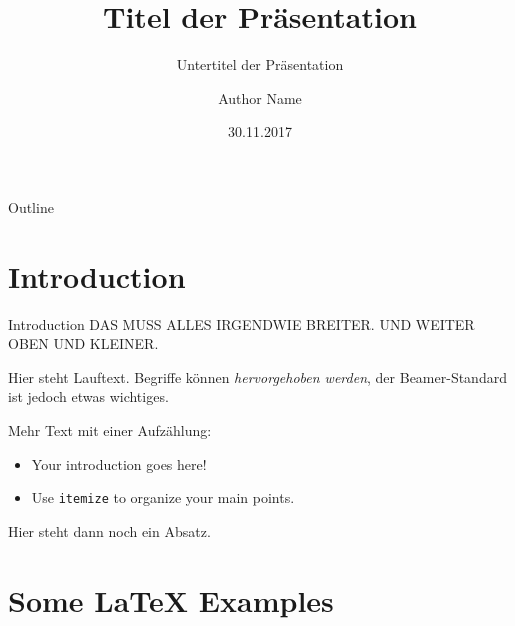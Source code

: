 \documentclass[10pt]{beamer}
\begin{document}

\title[HAW Hamburg Beamer]{Titel der Präsentation}
\subtitle{Untertitel der Präsentation}
\author{Author Name}
\date{30.11.2017}

\begin{frame}
  \titlepage
\end{frame}

\begin{frame}{Outline}
  \tableofcontents
\end{frame}

\section{Introduction}
\begin{frame}{Introduction}
  DAS MUSS ALLES IRGENDWIE BREITER. UND WEITER OBEN UND KLEINER.

  Hier steht Lauftext. Begriffe können \emph{hervorgehoben werden}, der Beamer-Standard ist jedoch \alert{etwas wichtiges}.

  Mehr Text mit einer Aufzählung:
  \begin{itemize}
    \item Your introduction goes here!
    \item Use \texttt{itemize} to organize your main points.
  \end{itemize}

  Hier steht dann noch ein Absatz.
\end{frame}


\section{Some \LaTeX{} Examples}
\end{document}
